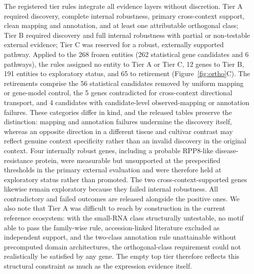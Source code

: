 \documentclass[11pt]{article}
\begin{document}
The registered tier rules integrate all evidence layers without discretion. Tier A required discovery, complete internal robustness, primary cross-context support, clean mapping and annotation, and at least one attributable orthogonal class; Tier B required discovery and full internal robustness with partial or non-testable external evidence; Tier C was reserved for a robust, externally supported pathway. Applied to the 268 frozen entities (262 statistical gene candidates and 6 pathways), the rules assigned no entity to Tier A or Tier C, 12 genes to Tier B, 191 entities to exploratory status, and 65 to retirement (Figure~\ref{fig:ortho}C). The retirements comprise the 56 statistical candidates removed by uniform mapping or gene-model control, the 5 genes contradicted for cross-context directional transport, and 4 candidates with candidate-level observed-mapping or annotation failures. These categories differ in kind, and the released tables preserve the distinction: mapping and annotation failures undermine the discovery itself, whereas an opposite direction in a different tissue and cultivar contrast may reflect genuine context specificity rather than an invalid discovery in the original context. Four internally robust genes, including a probable RPP8-like disease-resistance protein, were measurable but unsupported at the prespecified thresholds in the primary external evaluation and were therefore held at exploratory status rather than promoted. The two cross-context-supported genes likewise remain exploratory because they failed internal robustness. All contradictory and failed outcomes are released alongside the positive ones. We also note that Tier A was difficult to reach by construction in the current reference ecosystem: with the small-RNA class structurally untestable, no motif able to pass the family-wise rule, accession-linked literature excluded as independent support, and the two-class annotation rule unattainable without precomputed domain architectures, the orthogonal-class requirement could not realistically be satisfied by any gene. The empty top tier therefore reflects this structural constraint as much as the expression evidence itself.
\end{document}

